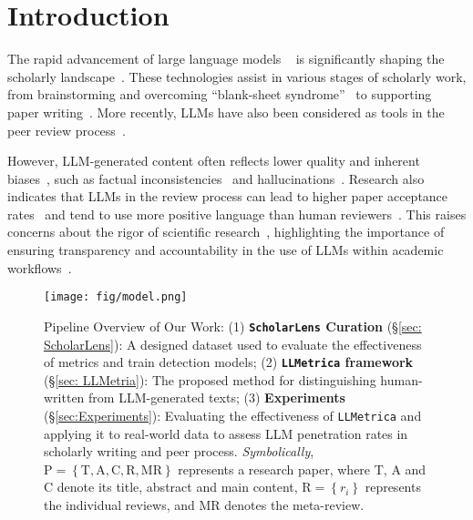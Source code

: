 \section{Introduction}

The rapid advancement of large language models ~\cite[LLMs;][] {achiam2023gpt, dubey2024llama, guo2025deepseek} is significantly shaping the scholarly landscape~\cite{hosseini2023fighting, geng2024impact}.
These technologies assist in various stages of scholarly work, from brainstorming and overcoming ``blank-sheet syndrome''~\cite{altmae2023artificial, baek2024researchagent, eger2025transformingsciencelargelanguage} to supporting paper writing~\cite{wang-etal-2018-paper, birhane2023science, khalifa2024using, rehman2025can}. 
More recently, LLMs have also been considered as tools in the peer review process~\cite{du-etal-2024-llms, zhou-etal-2024-llm, yu2024your, jin-etal-2024-agentreview, zou2024chatgpt}.



However, LLM-generated content often reflects lower quality and inherent biases~\cite{brooks-etal-2024-rise, du-etal-2024-llms}, such as factual inconsistencies~\cite{yang-etal-2024-fizz, chuang-etal-2024-lookback} and hallucinations~\cite{tang2024llms, chuang-etal-2024-lookback}. Research also indicates that LLMs in the review process can lead to higher paper acceptance rates~\cite{latona2024ai, jin-etal-2024-agentreview} and tend to use more positive language than human reviewers~\cite{zhou-etal-2024-llm}. 
This raises concerns about the rigor of scientific research~\cite{sun2024metawriter}, highlighting the importance of ensuring transparency and accountability in the use of LLMs within academic workflows~\cite{lund2024can}.



\begin{figure*}[t]
    \centering
    \texttt{[image: fig/model.png]}
    \caption{Pipeline Overview of Our Work: (1) \textbf{\texttt{ScholarLens} Curation} (\S\ref{sec: ScholarLens}): A designed dataset used to evaluate the effectiveness of metrics and train detection models; (2) \textbf{\texttt{LLMetrica} framework} (\S\ref{sec: LLMetria}): The proposed method for distinguishing human-written from LLM-generated texts; (3) \textbf{Experiments} (\S\ref{sec:Experiments}): Evaluating the effectiveness of \texttt{LLMetrica} and applying it to real-world data to assess LLM penetration rates in scholarly writing and peer process. \textit{Symbolically}, $\mathrm{P}=\left\{ \mathrm{T},\mathrm{A},\mathrm{C},\mathrm{R},\mathrm{MR} \right\}$ represents a research paper, where $\mathrm{T}$, $\mathrm{A}$ and $\mathrm{C}$ denote its title, abstract and main content, $\mathrm{R}=\left\{ r_i \right\}$ represents the individual reviews, and $\mathrm{MR}$ denotes the meta-review.}
    \label{fig:pipeline}
\end{figure*}

